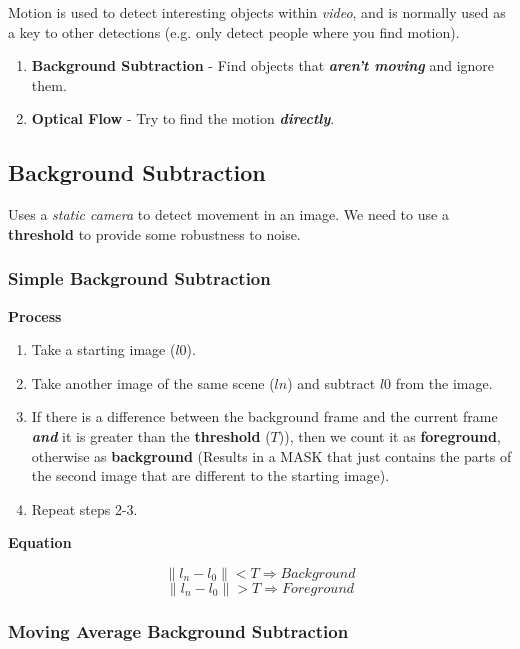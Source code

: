 \documentclass[english, 10pt]{article}
\begin{document}
Motion is used to detect interesting objects within \emph{video}, and is normally used as a key to other detections (e.g. only detect people where you find motion).

\begin{enumerate}
\def\labelenumi{\arabic{enumi}.}
\itemsep1pt\parskip0pt
\item
 \textbf{Background Subtraction} - Find objects that \textbf{\emph{aren't
  moving}} and ignore them.
\item
  \textbf{Optical Flow} - Try to find the motion \textbf{\emph{directly}}.
\end{enumerate}

\subsection{Background Subtraction}\label{background-subtraction}

Uses a \emph{static camera} to detect movement in an image. We need to
use a \textbf{threshold} to provide some robustness to noise.

\subsubsection{Simple Background
Subtraction}\label{simple-background-subtraction}

\textbf{Process}

\begin{enumerate}
\def\labelenumi{\arabic{enumi}.}
\itemsep1pt\parskip0pt
\item
  Take a starting image ($l0$).
\item
  Take another image of the same scene ($ln$) and subtract $l0$ from the image.
\item
  If there is a difference between the background frame and the current
  frame \textbf{\emph{and}} it is greater than the \textbf{threshold}
  ($T$)), then we count it as \textbf{foreground}, otherwise as
  \textbf{background} (Results in a MASK that just contains the parts of
  the second image that are different to the starting image).
\item
  Repeat steps 2-3.
\end{enumerate}

\textbf{Equation}

$$ \| l_n - l_0 \| < T \Longrightarrow Background$$
$$ \| l_n - l_0 \| > T \Longrightarrow Foreground$$

\subsubsection{Moving Average Background
Subtraction}
\end{document}
